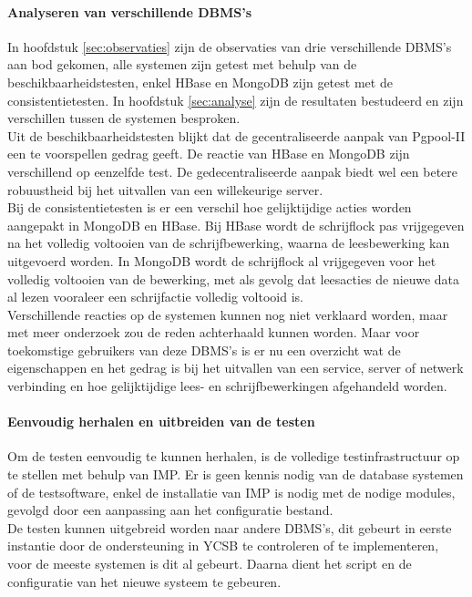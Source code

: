 \paragraph{Analyseren van verschillende DBMS's} In hoofdstuk \ref{sec:observaties} zijn de observaties van drie verschillende DBMS's aan bod gekomen, alle systemen zijn getest met behulp van de beschikbaarheidstesten, enkel HBase en MongoDB zijn getest met de consistentietesten. In hoofdstuk \ref{sec:analyse} zijn de resultaten bestudeerd en zijn verschillen tussen de systemen besproken. \\
Uit de beschikbaarheidstesten blijkt dat de gecentraliseerde aanpak van Pgpool-II een te voorspellen gedrag geeft. De reactie van HBase en MongoDB zijn verschillend op eenzelfde test. De gedecentraliseerde aanpak biedt wel een betere robuustheid bij het uitvallen van een willekeurige server. \\
Bij de consistentietesten is er een verschil hoe gelijktijdige acties worden aangepakt in MongoDB en HBase. Bij HBase wordt de schrijflock pas vrijgegeven na het volledig voltooien van de schrijfbewerking, waarna de leesbewerking kan uitgevoerd worden. In MongoDB wordt de schrijflock al vrijgegeven voor het volledig voltooien van de bewerking, met als gevolg dat leesacties de nieuwe data al lezen vooraleer een schrijfactie volledig voltooid is. \\
Verschillende reacties op de systemen kunnen nog niet verklaard worden, maar met meer onderzoek zou de reden achterhaald kunnen worden. Maar voor toekomstige gebruikers van deze DBMS's is er nu een overzicht wat de eigenschappen en het gedrag is bij het uitvallen van een service, server of netwerk verbinding en hoe gelijktijdige lees- en schrijfbewerkingen afgehandeld worden. 

\paragraph{Eenvoudig herhalen en uitbreiden van de testen} Om de testen eenvoudig te kunnen herhalen, is de volledige testinfrastructuur op te stellen met behulp van IMP. Er is geen kennis nodig van de database systemen of de testsoftware, enkel de installatie van IMP is nodig met de nodige modules, gevolgd door een aanpassing aan het configuratie bestand. \\
De testen kunnen uitgebreid worden naar andere DBMS's, dit gebeurt in eerste instantie door de ondersteuning in YCSB te controleren of te implementeren, voor de meeste systemen is dit al gebeurt. Daarna dient het script en de configuratie van het nieuwe systeem te gebeuren. 


